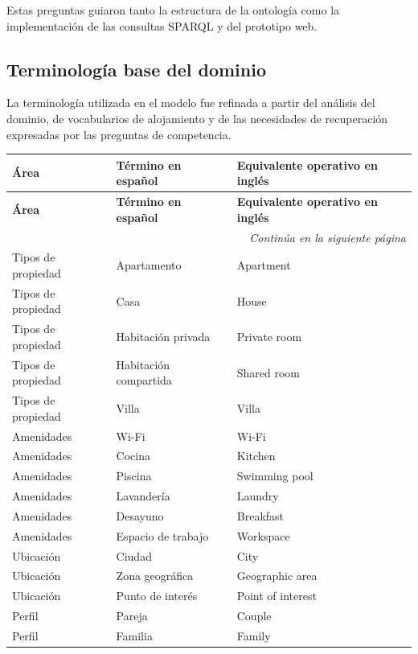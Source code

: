 Estas preguntas guiaron tanto la estructura de la ontología como la implementación de
las consultas SPARQL y del prototipo web.

\subsection{Terminología base del dominio}

La terminología utilizada en el modelo fue refinada a partir del análisis del dominio,
de vocabularios de alojamiento y de las necesidades de recuperación expresadas por las
preguntas de competencia.

\begin{longtable}{|p{3.3cm}|p{5.2cm}|p{5.2cm}|}
\hline
\textbf{Área} & \textbf{Término en español} & \textbf{Equivalente operativo en inglés} \\
\hline
\endfirsthead
\hline
\textbf{Área} & \textbf{Término en español} & \textbf{Equivalente operativo en inglés} \\
\hline
\endhead
\hline
\multicolumn{3}{|r|}{\textit{Continúa en la siguiente página}} \\
\hline
\endfoot
\hline
\endlastfoot
Tipos de propiedad & Apartamento & Apartment \\
\hline
Tipos de propiedad & Casa & House \\
\hline
Tipos de propiedad & Habitación privada & Private room \\
\hline
Tipos de propiedad & Habitación compartida & Shared room \\
\hline
Tipos de propiedad & Villa & Villa \\
\hline
Amenidades & Wi-Fi & Wi-Fi \\
\hline
Amenidades & Cocina & Kitchen \\
\hline
Amenidades & Piscina & Swimming pool \\
\hline
Amenidades & Lavandería & Laundry \\
\hline
Amenidades & Desayuno & Breakfast \\
\hline
Amenidades & Espacio de trabajo & Workspace \\
\hline
Ubicación & Ciudad & City \\
\hline
Ubicación & Zona geográfica & Geographic area \\
\hline
Ubicación & Punto de interés & Point of interest \\
\hline
Perfil & Pareja & Couple \\
\hline
Perfil & Familia & Family \\
\hline

\end{longtable}

